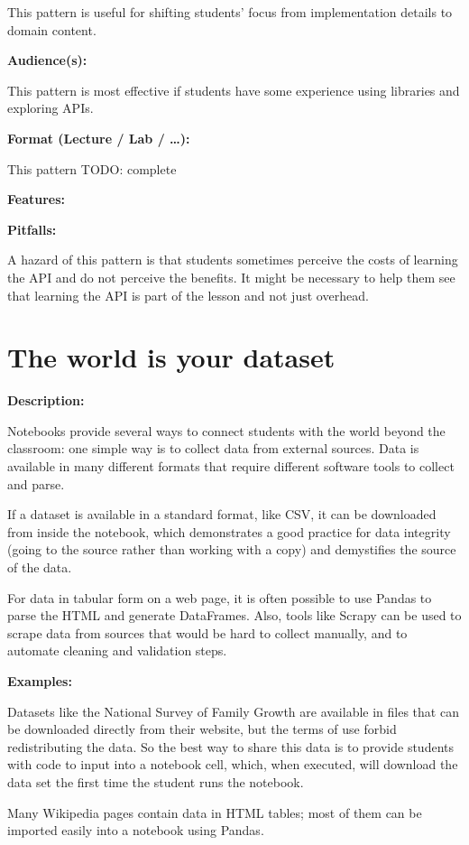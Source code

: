 \documentclass[]{book}
\begin{document}
This pattern is useful for shifting students' focus from implementation
details to domain content.

\textbf{Audience(s):}

This pattern is most effective if students have some experience using
libraries and exploring APIs.

\textbf{Format (Lecture / Lab / \ldots{}):}

This pattern TODO: complete

\textbf{Features:}

\textbf{Pitfalls:}

A hazard of this pattern is that students sometimes perceive the costs
of learning the API and do not perceive the benefits. It might be
necessary to help them see that learning the API is part of the lesson
and not just overhead.

\section{The world is your dataset}\label{the-world-is-your-dataset}

\textbf{Description:}

Notebooks provide several ways to connect students with the world beyond
the classroom: one simple way is to collect data from external sources.
Data is available in many different formats that require different
software tools to collect and parse.

If a dataset is available in a standard format, like CSV, it can be
downloaded from inside the notebook, which demonstrates a good practice
for data integrity (going to the source rather than working with a copy)
and demystifies the source of the data.

For data in tabular form on a web page, it is often possible to use
Pandas to parse the HTML and generate DataFrames. Also, tools like
Scrapy can be used to scrape data from sources that would be hard to
collect manually, and to automate cleaning and validation steps.

\textbf{Examples:}

Datasets like the National Survey of Family Growth are available in
files that can be downloaded directly from their website, but the terms
of use forbid redistributing the data. So the best way to share this
data is to provide students with code to input into a notebook cell,
which, when executed, will download the data set the first time the
student runs the notebook.

Many Wikipedia pages contain data in HTML tables; most of them can be
imported easily into a notebook using Pandas.
\end{document}
